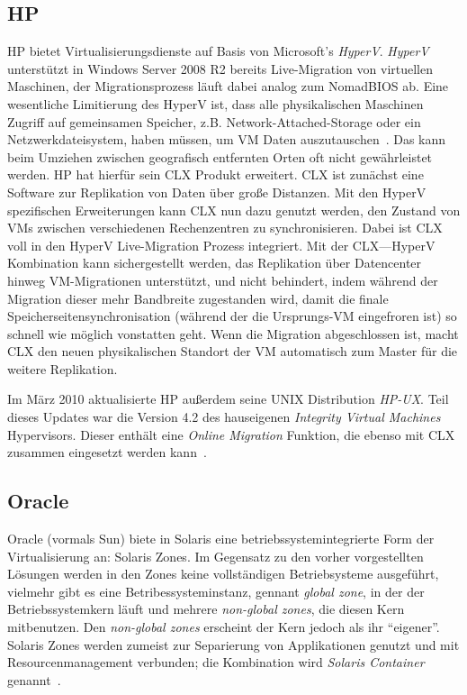 \subsection{HP}
HP bietet Virtualisierungsdienste auf Basis von Microsoft's
\emph{HyperV}. \emph{HyperV} unterstützt in Windows Server 2008 R2
bereits Live-Migration von virtuellen Maschinen, der Migrationsprozess
läuft dabei analog zum NomadBIOS ab. Eine wesentliche Limitierung des
HyperV ist, dass alle physikalischen Maschinen Zugriff auf gemeinsamen
Speicher, z.B. Network-Attached-Storage oder ein Netzwerkdateisystem,
haben müssen, um \ac{VM} Daten auszutauschen~\cite{hp2010hyperV}. Das kann
beim Umziehen zwischen geografisch entfernten Orten oft nicht
gewährleistet werden. HP hat hierfür sein \ac{CLX} Produkt
erweitert. \ac{CLX} ist zunächst eine Software zur Replikation von Daten
über große Distanzen. Mit den HyperV spezifischen Erweiterungen kann
\ac{CLX} nun dazu genutzt werden, den Zustand von \acp{VM} zwischen
verschiedenen Rechenzentren zu synchronisieren. Dabei ist \ac{CLX} voll in
den HyperV Live-Migration Prozess integriert. Mit der \ac{CLX}---HyperV
Kombination kann sichergestellt werden, das Replikation über
Datencenter hinweg \ac{VM}-Migrationen unterstützt, und nicht behindert,
indem während der Migration dieser mehr Bandbreite zugestanden wird,
damit die finale Speicherseitensynchronisation (während der die
Ursprungs-\ac{VM} eingefroren ist) so schnell wie möglich vonstatten
geht. Wenn die Migration abgeschlossen ist, macht \ac{CLX} den neuen
physikalischen Standort der \ac{VM} automatisch zum Master für die weitere
Replikation.

Im März 2010 aktualisierte HP außerdem seine UNIX Distribution
\emph{HP-UX}. Teil dieses Updates war die Version 4.2 des hauseigenen
\emph{Integrity Virtual Machines} Hypervisors. Dieser enthält eine
\emph{Online Migration} Funktion, die ebenso mit \ac{CLX} zusammen
eingesetzt werden kann~\cite{hp2010integrity}.

\subsection{Oracle}

Oracle (vormals Sun) biete in Solaris eine betriebssystemintegrierte
Form der Virtualisierung an: Solaris Zones. Im Gegensatz zu den vorher
vorgestellten Lösungen werden in den Zones keine vollständigen
Betriebsysteme ausgeführt, vielmehr gibt es eine
Betribessysteminstanz, gennant \emph{global zone}, in der der
Betriebssystemkern läuft und mehrere \emph{non-global zones}, die
diesen Kern mitbenutzen. Den \emph{non-global zones} erscheint der
Kern jedoch als ihr "`eigener"'. Solaris Zones werden zumeist zur
Separierung von Applikationen genutzt und mit Resourcenmanagement
verbunden; die Kombination wird \emph{Solaris Container} genannt~\cite{price2004solaris}.

